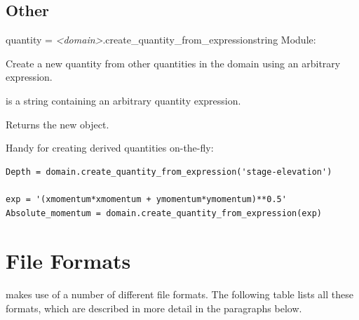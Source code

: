 \documentclass{manual}
\begin{document}
\section{Other}
\begin{methoddesc}{quantity = \emph{<domain>}.create_quantity_from_expression}{string}
Module: 

Create a new quantity from other quantities in the domain using an arbitrary expression.

 is a string containing an arbitrary quantity expression.

Returns the new  object.

Handy for creating derived quantities on-the-fly:

\begin{verbatim}
Depth = domain.create_quantity_from_expression('stage-elevation')

exp = '(xmomentum*xmomentum + ymomentum*ymomentum)**0.5'
Absolute_momentum = domain.create_quantity_from_expression(exp)
\end{verbatim}

\end{methoddesc}


\chapter{\anuga File Formats}

\label{sec:file formats}

\anuga makes use of a number of different file formats. The
following table lists all these formats, which are described in more
detail in the paragraphs below.
\end{document}
